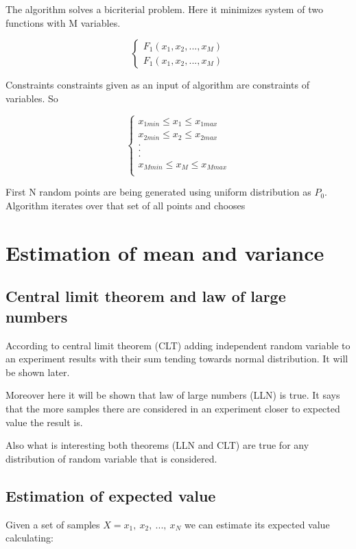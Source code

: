 \documentclass[11pt]{article}
\begin{document}
	The algorithm solves a bicriterial problem. Here it minimizes system of two
	functions with M variables.
	
	$$\begin{cases}
		F_{1}(x_{1},x_{2},...,x_{M})\\
		F_{1}(x_{1},x_{2},...,x_{M})
	\end{cases}$$
	
	Constraints constraints given as an input of algorithm are constraints of
	variables. So
	
	$$\begin{cases}
		x_{1min} \leq x_{1} \leq x_{1max}\\
		x_{2min} \leq x_{2} \leq x_{2max}\\
		.\\
		.\\
		.\\
		x_{Mmin} \leq x_{M} \leq x_{Mmax}\\
	\end{cases}$$
	
	First N random points are being generated using uniform distribution as
	$P_{0}$.
	Algorithm iterates over that set of all points and chooses 
	
		
	\section{Estimation of mean and variance}		
	\subsection{Central limit theorem and law of large numbers}
	
	According to central limit theorem (CLT) adding independent random variable
	to an experiment results with their sum tending towards normal distribution.
	It will be shown later.
	
	Moreover here it will be shown that law of large numbers (LLN) is true.
	It says that the more samples there are considered in an experiment closer
	to expected value the result is.
	
	Also what is interesting both theorems (LLN and CLT) are true for any
	distribution of random variable that is considered. 	
	
	\subsection{Estimation of expected value}
	
	Given a set of samples $X={x_{1},\ x_{2},\ ...,\ x_{N}}$ we can estimate
	its expected value calculating:
	
\end{document}
